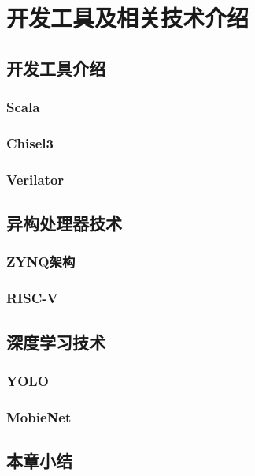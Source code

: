 \chapter{开发工具及相关技术介绍}

\section{开发工具介绍}
    \subsection{Scala}
    \subsection{Chisel3}
    \subsection{Verilator}

\section{异构处理器技术}
    \subsection{ZYNQ架构}
    \subsection{RISC-V}

\section{深度学习技术}
    \subsection{YOLO}
    \subsection{MobieNet}

\section{本章小结}


